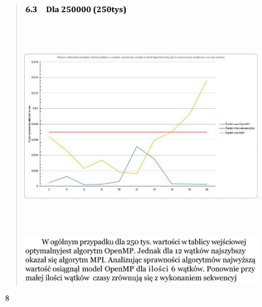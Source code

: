\documentclass[
]{article}
\begin{document}
\begin{quote}
\includegraphics[width=2.16667in,height=0.23611in]{vertopal_45f5e71363bf454ba37a280ca069ec4b/media/image33.png}

\includegraphics[width=6.68889in,height=4.1875in]{vertopal_45f5e71363bf454ba37a280ca069ec4b/media/image34.png}

\includegraphics[width=4.83333in,height=0.98611in]{vertopal_45f5e71363bf454ba37a280ca069ec4b/media/image35.png}
\end{quote}

\includegraphics[width=0.15278in,height=0.19444in]{vertopal_45f5e71363bf454ba37a280ca069ec4b/media/image36.png}
\end{document}
